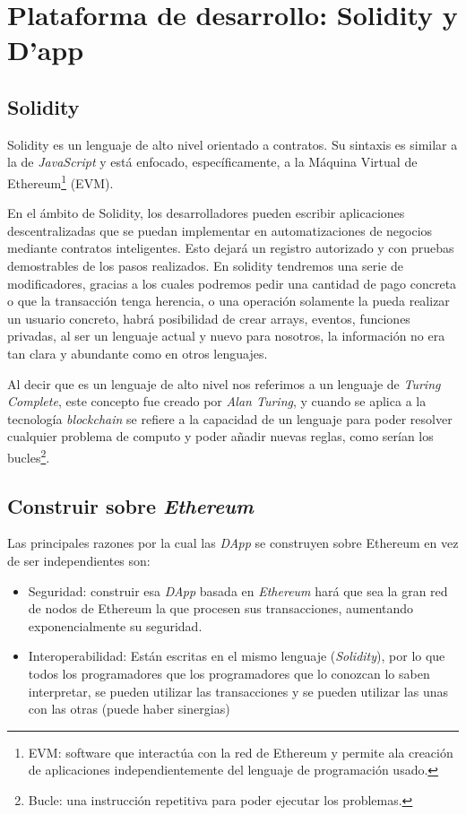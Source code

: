 \section{Plataforma de desarrollo: Solidity y D'app}

\subsection{Solidity}

Solidity\cite{solidity} es un lenguaje de alto nivel orientado a contratos. Su sintaxis es similar a la de \textit{JavaScript} y está enfocado, específicamente, a la Máquina Virtual de Ethereum\footnote{EVM: software que interactúa con la red de Ethereum y permite ala creación de aplicaciones independientemente del lenguaje de programación usado.} (EVM).

En el ámbito de Solidity\cite{solidity1}, los desarrolladores pueden escribir aplicaciones descentralizadas que se puedan implementar en automatizaciones de negocios mediante contratos inteligentes. Esto dejará un registro autorizado y con pruebas demostrables de los pasos realizados. En solidity tendremos una serie de modificadores, gracias a los cuales podremos pedir una cantidad de pago concreta o que la transacción tenga herencia, o una operación solamente la pueda realizar un usuario concreto, habrá posibilidad de crear arrays, eventos, funciones privadas, al ser un lenguaje actual y nuevo para nosotros, la información no era tan clara y abundante como en otros lenguajes.

Al decir que es un lenguaje de alto nivel nos referimos a un lenguaje de \textit{Turing Complete}, este concepto fue creado por \textit{Alan Turing}, y cuando se aplica a la tecnología \textit{blockchain} se refiere a la capacidad de un lenguaje para poder resolver cualquier problema de computo y poder añadir nuevas reglas, como serían los bucles\footnote{Bucle: una instrucción repetitiva para poder ejecutar los problemas.}.

\subsection{Construir sobre \textit{Ethereum}}

Las principales razones por la cual las \textit{DApp} se construyen sobre Ethereum en vez de ser independientes son:
\begin{itemize}
	\item Seguridad:  construir esa \textit{DApp} basada en \textit{Ethereum} hará que sea la gran red de nodos de Ethereum la que procesen sus transacciones, aumentando exponencialmente su seguridad.
	
	\item Interoperabilidad: Están escritas en el mismo lenguaje (\textit{Solidity}), por lo que todos los programadores que  los programadores que lo conozcan lo saben interpretar, se pueden utilizar las transacciones y se pueden utilizar las unas con las otras (puede haber sinergias)
\end{itemize}

